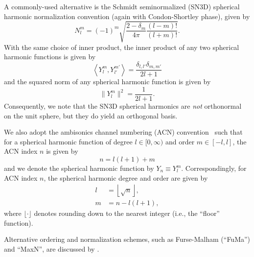 A commonly-used alternative is the Schmidt seminormalized (SN3D) spherical harmonic normalization convention (again with Condon-Shortley phase), given by \citep{Nachbar2011}
\begin{equation}\label{eq:02_Acoustical_Theory:Spherical_Harmonic_SN3D_Normalization}
N_l^m = (-1)^m \sqrt{\frac{2 - \delta_m}{4 \pi} \frac{(l-m)!}{(l+m)!}}.
\end{equation}
With the same choice of inner product, the inner product of any two spherical harmonic functions is given by
\begin{equation}
\left< Y_l^m, Y_{l'}^{m'} \right> = \frac{\delta_{l,l'} \delta_{m,m'}}{2l+1}
\end{equation}
and the squared norm of any spherical harmonic function is given by
\begin{equation}
\|Y_l^m\|^2 = \frac{1}{2l+1}.
\end{equation} %
Consequently, we note that the SN3D spherical harmonics are \textit{not} orthonormal on the unit sphere, but they do yield an orthogonal basis.

We also adopt the ambisonics channel numbering (ACN) convention~\citep{Nachbar2011} such that for a spherical harmonic function of degree $l \in [0,\infty)$ and order $m \in [-l,l]$, the ACN index $n$ is given by
\begin{equation}\label{eq:02_Acoustical_Theory:AmbOrder_To_ACN}
n = l (l + 1) + m
\end{equation}
and we denote the spherical harmonic function by $Y_n \equiv Y_l^m$.
Correspondingly, for ACN index $n$, the spherical harmonic degree and order are given by
\begin{equation}\label{eq:02_Acoustical_Theory:ACN_To_AmbOrder}
\begin{aligned}
l &= \left\lfloor \sqrt{n} \right\rfloor,\\
m &= n - l (l + 1),
\end{aligned}
\end{equation}
where $\lfloor \cdot \rfloor$ denotes rounding down to the nearest integer (i.e., the ``floor'' function).

Alternative ordering and normalization schemes, such as Furse-Malham (``FuMa'') and ``MaxN'', are discussed by \citet[and references therein]{Carpentier2017}.
